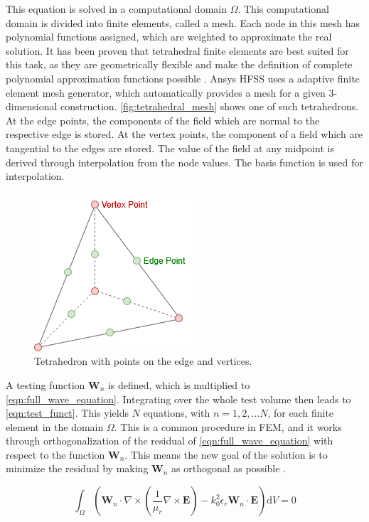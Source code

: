 This equation is solved in a computational domain $\Omega$. This computational domain is divided into finite elements, called a mesh. Each node in this mesh has polynomial functions assigned, which are weighted to approximate the real solution. It has been proven that tetrahedral finite elements are best suited for this task, as they are geometrically flexible and make the definition of complete polynomial approximation functions possible \cite{Shenton_Cendes_1985}. Ansys HFSS uses a adaptive finite element mesh generator, which automatically provides a mesh for a given 3-dimensional construction. \autoref{fig:tetrahedral_mesh} shows one of such tetrahedrons. At the edge points, the components of the field which are normal to the respective edge is stored. At the vertex points, the component of a field which are tangential to the edges are stored. The value of the field at any midpoint is derived through interpolation from the node values. The basis function is used for interpolation.

\begin{figure}[h]
    \centering
    \includegraphics[width=0.25\linewidth]{Documentation/content/10_theory/img/tetrahedral_mesh.png}
    \caption{Tetrahedron with points on the edge and vertices.}
    \label{fig:tetrahedral_mesh}
\end{figure}

A testing function $\mathbf{W}_n$ is defined, which is multiplied to \autoref{eqn:full_wave_equation}. Integrating over the whole test volume then leads to \autoref{eqn:test_funct}. This yields $N$ equations, with $n=1,2,...N$, for each finite element in the domain $\Omega$. This is a common procedure in FEM, and it works through orthogonalization of the residual of \autoref{eqn:full_wave_equation} with respect to the function $\mathbf{W}_n$. This means the new goal of the solution is to minimize the residual by making $\mathbf{W}_n$ as orthogonal as possible \cite{Mohsen_1982}.

\begin{equation}
    \int_\Omega\left( \mathbf{W}_n\cdot\nabla \times\left( \frac{1}{\mu_r}\nabla\times\mathbf{E} \right)-k_0^2\epsilon_r\mathbf{W}_n\cdot\mathbf{E} \right)\mathrm{d}V=0
    \label{eqn:test_funct}
\end{equation}

